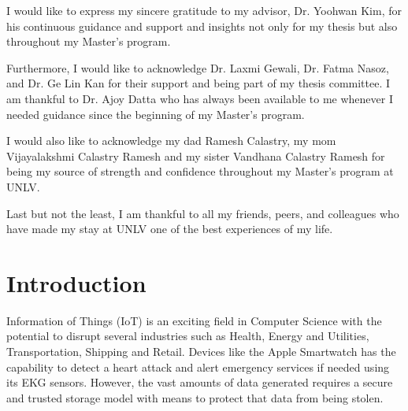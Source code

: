 \documentclass[11pt,openright]{report}
\begin{document}
\begin{thesisacknowledgments}
I would like to express my sincere gratitude to my advisor, Dr. Yoohwan Kim, for his continuous guidance and support and insights not only for my thesis but also throughout my Master's program.

Furthermore, I would like to acknowledge Dr. Laxmi Gewali, Dr. Fatma Nasoz, and Dr. Ge Lin Kan for their support and being part of my thesis committee. I am thankful to Dr. Ajoy Datta who has always been available to me whenever I needed guidance since the beginning of my Master's program.

I would also like to acknowledge my dad Ramesh Calastry, my mom Vijayalakshmi Calastry Ramesh and my sister Vandhana Calastry Ramesh for being my source of strength and confidence throughout my Master's program at UNLV.

Last but not the least, I am thankful to all my friends, peers, and colleagues who have made my stay at UNLV one of the best experiences of my life. 
\end{thesisacknowledgments}

\pagestyle{plain}

\tableofcontents
\clearpage
\listoftables
\clearpage
\listoffigures
\clearpage
\listofalgorithms
\clearpage

\chapter{Introduction}\label{chapter:introduction} 

Information of Things (IoT) is an exciting field in Computer Science with the potential to disrupt several industries such as Health, Energy and Utilities, Transportation, Shipping and Retail. Devices like the Apple Smartwatch has the capability to detect a heart attack and alert emergency services if needed using its EKG sensors. However, the vast amounts of data generated requires a secure and trusted storage model with means to protect that data from being stolen. 
\end{document}
